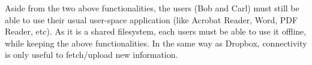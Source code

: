 \documentclass[../main.tex]{subfiles}
\begin{document}
\medbreak
\par Aside from the two above functionalities, the users (Bob and Carl) must still be able to use their usual user-space application (like Acrobat Reader, Word, PDF Reader, etc). As it is a shared filesystem, each users must be able to use it offline, while keeping the above functionalities. In the same way as Dropbox, connectivity is only useful to fetch/upload new information.
\end{document}
